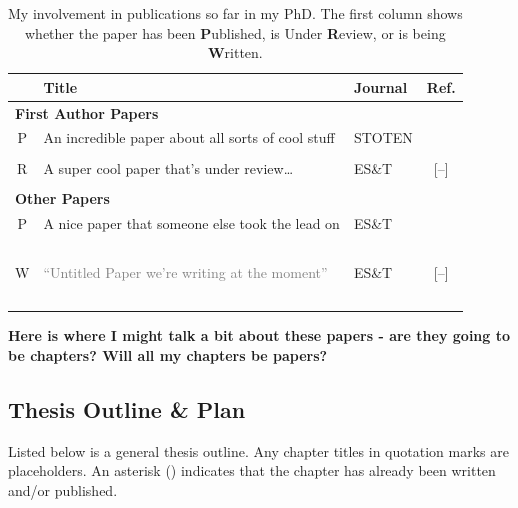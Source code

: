 \documentclass[12pt]{article}
\begin{document}
\begin{table}[h]
    \centering
    \begin{tabularx}{\linewidth}{cXlc}
        \toprule
             & \textbf{Title} & \textbf{Journal}  & \textbf{Ref.} \\
        \midrule
            \multicolumn{4}{l}{\textbf{First Author Papers}} \\
        \midrule
            P & An incredible paper about all sorts of cool stuff & STOTEN & \cite{Davison2020} \\
            \\
            R & A super cool paper that's under review\dots & ES\&T & [--] \\
            \\
        \midrule
            \multicolumn{4}{l}{\textbf{Other Papers}} \\
        \midrule
             P & A nice paper that someone else took the lead on & ES\&T & \cite{Grange2020}\\~\\
             W & \textcolor{gray}{``Untitled Paper we're writing at the moment''} & ES\&T & [--] \\~\\
        \bottomrule
    \end{tabularx}
    \caption{My involvement in publications so far in my PhD. The first column shows whether the paper has been \textbf{P}ublished, is Under \textbf{R}eview, or is being \textbf{W}ritten.}
    \label{tab:pubs}
\end{table}

\textbf{Here is where I might talk a bit about these papers - are they going to be chapters? Will all my chapters be papers?} \lipsum[1]

\clearpage\subsection{Thesis Outline \& Plan}\label{sec:thesis}

Listed below is a general thesis outline. Any chapter titles in quotation marks are placeholders. An asterisk (\textasteriskcentered) indicates that the chapter has already been written and/or published.
\end{document}
